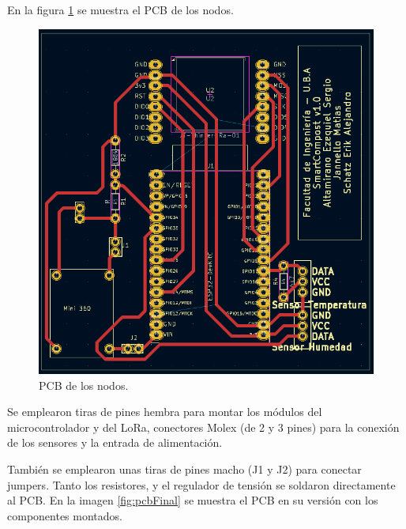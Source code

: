 En la figura \ref{fig:pcb} se muestra el PCB de los nodos.

\begin{figure}[H]
	\centering
	\includegraphics[scale=0.8]{./Figures/Hardware/PCB/pcb.png}
	\caption{PCB de los nodos.}
	\label{fig:pcb}
\end{figure}



Se emplearon tiras de pines hembra para montar los módulos del microcontrolador y del LoRa, conectores Molex (de 2 y 3 pines) para la conexión de los sensores y la entrada de alimentación.

También se emplearon unas tiras de pines macho (J1 y J2) para conectar jumpers. Tanto los resistores, y el regulador de tensión se soldaron directamente al PCB.
En la imagen \ref{fig:pcbFinal} se muestra el PCB en su versión con los componentes montados.

